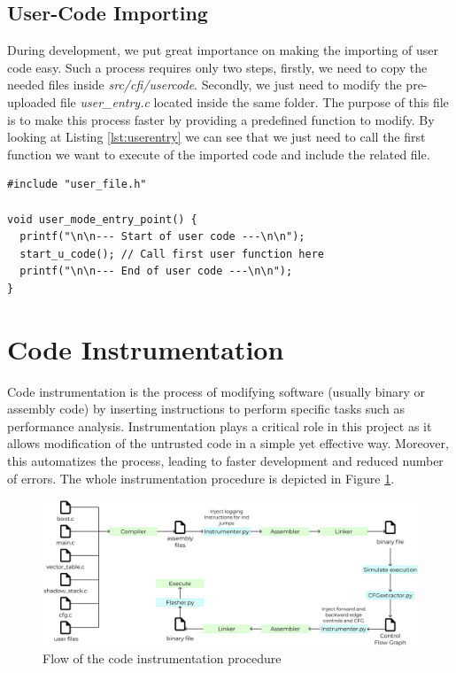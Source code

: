 \subsection{User-Code Importing}
\label{subsec:project_ucodeimport}

During development, we put great importance on making the importing of user code
easy. Such a process requires only two steps, firstly, we need to copy the
needed files inside \textit{src/cfi/usercode}. Secondly, we just need to modify the
pre-uploaded file \textit{user\_entry.c} located inside the same folder. The purpose
of this file is to make this process faster by providing a predefined function to
modify. By looking at Listing \ref{lst:userentry} we can see that we just need
to call the first function we want to execute of the imported code and include
the related file. \\ \begin{lstlisting}[style=CStyle, caption = \textit{user\_entry.c} file, label={lst:userentry}]
#include "user_file.h"

void user_mode_entry_point() {
  printf("\n\n--- Start of user code ---\n\n");
  start_u_code(); // Call first user function here
  printf("\n\n--- End of user code ---\n\n");
}
\end{lstlisting}

\section{Code Instrumentation}
\label{sec:project_instrumentation}

Code instrumentation is the process of modifying software (usually binary or
assembly code) by inserting instructions to perform specific tasks such as performance
analysis. Instrumentation plays a critical role in this project as it allows
modification of the untrusted code in a simple yet effective way. Moreover, this
automatizes the process, leading to faster development and reduced number of errors.
The whole instrumentation procedure is depicted in Figure
\ref{fig:instrumentation}. \\
\begin{figure}[htbp]
  \centering
  \includegraphics[width=.9\linewidth]{images/instrumentation.png}
  \caption{Flow of the code instrumentation procedure}
  \label{fig:instrumentation}
\end{figure}
\\

